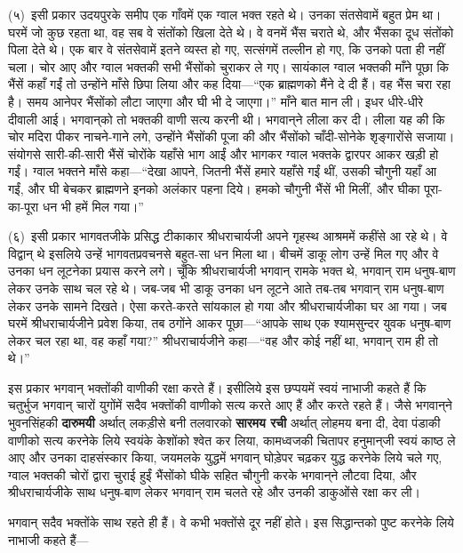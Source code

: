 \begin{sloppypar}\justifying{}
(५)~इसी प्रकार उदयपुरके समीप एक गाँवमें एक ग्वाल भक्त रहते थे। उनका संत\-सेवामें बहुत प्रेम था। घरमें जो कुछ रहता था, वह सब वे संतोंको खिला देते थे। वे वनमें भैंस चराते थे, और भैंसका दूध संतोंको पिला देते थे। एक बार वे संत\-सेवामें इतने व्यस्त हो गए, सत्संगमें तल्लीन हो गए, कि उनको पता ही नहीं चला। चोर आए और ग्वाल भक्तकी सभी भैंसोंको चुराकर ले गए। सायंकाल ग्वाल भक्तकी माँने पूछा कि भैंसें कहाँ गईं तो उन्होंने माँसे छिपा लिया और कह दिया—“एक ब्राह्मणको मैंने दे दी हैं। वह भैंस चरा रहा है। समय आनेपर भैंसोंको लौटा जाएगा और घी भी दे जाएगा।” माँने बात मान ली। इधर धीरे-धीरे दीवाली आई। भगवान्‌‍को तो भक्तकी वाणी सत्य करनी थी। भगवान्‌‍ने लीला कर दी। लीला यह की कि चोर मदिरा पीकर नाचने-गाने लगे, उन्होंने भैंसोंकी पूजा की और भैंसोंको चाँदी-सोनेके शृङ्गारोंसे सजाया। संयोगसे सारी-की-सारी भैंसें चोरोंके यहाँसे भाग आईं और भागकर ग्वाल भक्तके द्वारपर आकर खड़ी हो गईं। ग्वाल भक्तने माँसे कहा—“देखा आपने, जितनी भैंसें हमारे यहाँसे गईं थीं, उसकी चौगुनी यहाँ आ गईं, और घी बेचकर ब्राह्मणने इनको अलंकार पहना दिये। हमको चौगुनी भैंसें भी मिलीं, और घीका पूरा-का-पूरा धन भी हमें मिल गया।”
\end{sloppypar}
\begin{sloppypar}\justifying{}
(६)~इसी प्रकार भागवतजीके प्रसिद्ध टीकाकार श्रीधराचार्यजी अपने गृहस्थ आश्रममें कहींसे आ रहे थे। वे विद्वान् थे इसलिये उन्हें भागवत\-प्रवचनसे बहुत-सा धन मिला था। बीचमें डाकू लोग उन्हें मिल गए और वे उनका धन लूटनेका प्रयास करने लगे। चूँकि श्रीधराचार्यजी भगवान् रामके भक्त थे, भगवान् राम धनुष-बाण लेकर उनके साथ चल रहे थे। जब-जब भी डाकू उनका धन लूटने आते तब-तब भगवान् राम धनुष-बाण लेकर उनके सामने दिखते। ऐसा करते-करते सांयकाल हो गया और श्रीधराचार्यजीका घर आ गया। जब घरमें श्रीधराचार्यजीने प्रवेश किया, तब ठगोंने आकर पूछा—“आपके साथ एक श्याम\-सुन्दर युवक धनुष-बाण लेकर चल रहा था, वह कहाँ गया?” श्रीधराचार्यजीने कहा—“वह और कोई नहीं था, भगवान् राम ही तो थे।”
\end{sloppypar}
\begin{sloppypar}\justifying{}
इस प्रकार भगवान् भक्तोंकी वाणीकी रक्षा करते हैं। इसीलिये इस छप्पयमें स्वयं नाभाजी कहते हैं कि चतुर्भुज भगवान् चारों युगोंमें सदैव भक्तोंकी वाणीको सत्य करते आए हैं और करते रहते हैं। जैसे भगवान्‌‍ने भुवनसिंहकी \textbf{दारुमयी} अर्थात् लकड़ीसे बनी तलवारको \textbf{सारमय रची} अर्थात् लोहमय बना दी, देवा पंडाकी वाणीको सत्य करनेके लिये स्वयंके केशोंको श्वेत कर लिया, कामध्वजकी चितापर हनुमान्‌जी स्वयं काष्ठ ले आए और उनका दाह\-संस्कार किया, जयमलके युद्धमें भगवान् घोड़ेपर चढ़कर युद्ध करनेके लिये चले गए, ग्वाल भक्तकी चोरों द्वारा चुराई हुईं भैंसोंको घीके सहित चौगुनी करके भगवान्‌‍ने लौटवा दिया, और श्रीधराचार्यजीके साथ धनुष-बाण लेकर भगवान् राम चलते रहे और उनकी डाकुओंसे रक्षा कर ली।
\end{sloppypar}
\begin{sloppypar}\justifying{}
भगवान् सदैव भक्तोंके साथ रहते ही हैं। वे कभी भक्तोंसे दूर नहीं होते। इस सिद्धान्तको पुष्ट करनेके लिये नाभाजी कहते हैं—
\end{sloppypar}

